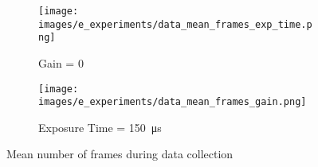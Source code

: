             \begin{figure}[ht]
                \centering
                \begin{subfigure}{0.55\textwidth}
                    \texttt{[image: images/e\_experiments/data\_mean\_frames\_exp\_time.png]}
                    \caption{Gain = 0}
                    \label{subfig:data_mean_frames_exp_time.png}
                \end{subfigure}

                \begin{subfigure}{0.55\textwidth}
                    \texttt{[image: images/e\_experiments/data\_mean\_frames\_gain.png]}
                    \caption{Exposure Time = \SI{150}{\micro\second}}
                    \label{subfig:data_mean_frames_exp_time.png}
                \end{subfigure}
                \caption{Mean number of frames during data collection}
                \label{fig:mean_frames_data_collection}
            \end{figure}

